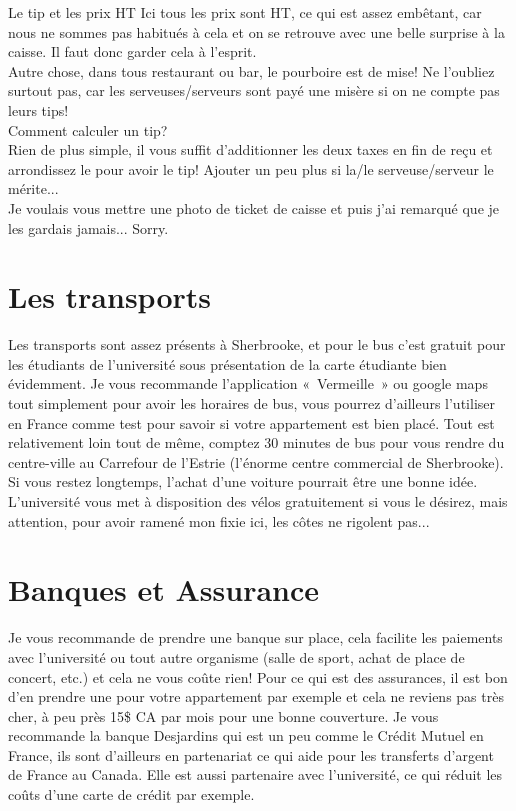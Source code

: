 \begin{example}{Le tip et les prix HT}
  Ici tous les prix sont HT, ce qui est assez embêtant, car nous ne sommes pas habitués à cela et on se retrouve avec une belle surprise à la caisse. Il faut donc garder cela à l’esprit. \\
  Autre chose, dans tous restaurant ou bar, le pourboire est de mise! Ne l’oubliez surtout pas, car les serveuses/serveurs sont payé une misère si on ne compte pas leurs tips!\\
  Comment calculer un tip? \\
  Rien de plus simple, il vous suffit d’additionner les deux taxes en fin de reçu et arrondissez le pour avoir le tip! Ajouter un peu plus si la/le serveuse/serveur le mérite... \\
  Je voulais vous mettre une photo de ticket de caisse et puis j'ai remarqué que je les gardais jamais... Sorry.
\end{example}


\section{Les transports}\label{sec:sec4.5}
Les transports sont assez présents à Sherbrooke, et pour le bus c’est gratuit pour les étudiants de l’université sous présentation de la carte étudiante bien évidemment. Je vous recommande l’application « Vermeille » ou google maps tout simplement pour avoir les horaires de bus, vous pourrez d’ailleurs l’utiliser en France comme test pour savoir si votre appartement est bien placé. Tout est relativement loin tout de même, comptez 30 minutes de bus pour vous rendre du centre-ville au Carrefour de l’Estrie (l’énorme centre commercial de Sherbrooke). Si vous restez longtemps, l’achat d’une voiture pourrait être une bonne idée.
L’université vous met à disposition des vélos gratuitement si vous le désirez, mais attention, pour avoir ramené mon fixie ici, les côtes ne rigolent pas...

\section{Banques et Assurance}\label{sec:sec4.6}
Je vous recommande de prendre une banque sur place, cela facilite les paiements avec l’université ou tout autre organisme (salle de sport, achat de place de concert, etc.) et cela ne vous coûte rien! Pour ce qui est des assurances, il est bon d’en prendre une pour votre appartement par exemple et cela ne reviens pas très cher, à peu près 15\$ CA par mois pour une bonne couverture.
Je vous recommande la banque Desjardins qui est un peu comme le Crédit Mutuel en France, ils sont d’ailleurs en partenariat ce qui aide pour les transferts d’argent de France au Canada. Elle est aussi partenaire avec l’université, ce qui réduit les coûts d’une carte de crédit par exemple.

